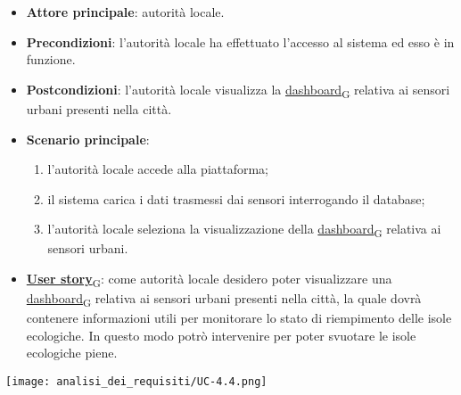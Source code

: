 
\begin{itemize}
	\item \textbf{Attore principale}: autorità locale.
	\item \textbf{Precondizioni}: l'autorità locale ha effettuato l'accesso al sistema ed esso è in funzione.
	\item \textbf{Postcondizioni}: l'autorità locale visualizza la \href{https://7last.github.io/docs/pb/documentazione-interna/glossario\#dashboard}{dashboard\textsubscript{G}} relativa
	      ai sensori urbani presenti nella città.
	\item \textbf{Scenario principale}:
	      \begin{enumerate}
		      \item l'autorità locale accede alla piattaforma;
		      \item il sistema carica i dati trasmessi dai sensori interrogando il database;
		      \item l'autorità locale seleziona la visualizzazione della \href{https://7last.github.io/docs/pb/documentazione-interna/glossario\#dashboard}{dashboard\textsubscript{G}} relativa ai sensori urbani.
	      \end{enumerate}
	\item \href{https://7last.github.io/docs/pb/documentazione-interna/glossario\#user-story}{\textbf{User story}\textsubscript{G}}:
	      come autorità locale desidero poter visualizzare una \href{https://7last.github.io/docs/pb/documentazione-interna/glossario\#dashboard}{dashboard\textsubscript{G}} relativa ai sensori urbani presenti nella città, la quale
	      dovrà contenere informazioni utili per monitorare lo stato di riempimento delle isole ecologiche. In questo modo potrò intervenire
	      per poter svuotare le isole ecologiche piene.
\end{itemize}
\begin{center}
	\texttt{[image: analisi\_dei\_requisiti/UC-4.4.png]}
\end{center}


